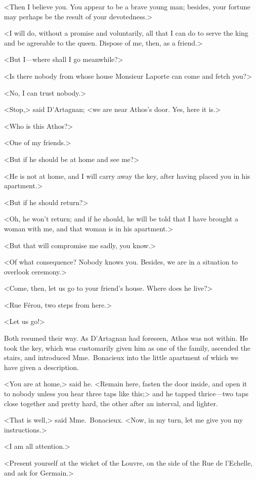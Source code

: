 <Then I believe you. You appear to be a brave young man; besides, your fortune may perhaps be the result of your devotedness.> 

<I will do, without a promise and voluntarily, all that I can do to serve the king and be agreeable to the queen. Dispose of me, then, as a friend.> 

<But I—where shall I go meanwhile?> 

<Is there nobody from whose house Monsieur Laporte can come and fetch you?> 

<No, I can trust nobody.> 

<Stop,> said D'Artagnan; <we are near Athos's door. Yes, here it is.> 

<Who is this Athos?> 

<One of my friends.> 

<But if he should be at home and see me?> 

<He is not at home, and I will carry away the key, after having placed you in his apartment.> 

<But if he should return?> 

<Oh, he won't return; and if he should, he will be told that I have brought a woman with me, and that woman is in his apartment.> 

<But that will compromise me sadly, you know.> 

<Of what consequence? Nobody knows you. Besides, we are in a situation to overlook ceremony.> 

<Come, then, let us go to your friend's house. Where does he live?> 

<Rue Férou, two steps from here.> 

<Let us go!> 

Both resumed their way. As D'Artagnan had foreseen, Athos was not within. He took the key, which was customarily given him as one of the family, ascended the stairs, and introduced Mme.~Bonacieux into the little apartment of which we have given a description. 

<You are at home,> said he. <Remain here, fasten the door inside, and open it to nobody unless you hear three taps like this;> and he tapped thrice—two taps close together and pretty hard, the other after an interval, and lighter. 

<That is well,> said Mme.~Bonacieux. <Now, in my turn, let me give you my instructions.> 

<I am all attention.> 

<Present yourself at the wicket of the Louvre, on the side of the Rue de l'Echelle, and ask for Germain.> 


